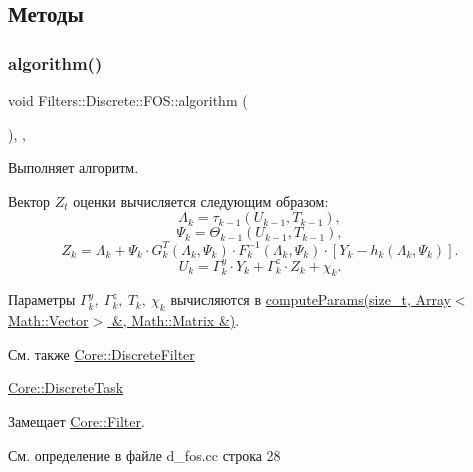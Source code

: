 \subsection{Методы}
\hypertarget{class_filters_1_1_discrete_1_1_f_o_s_a66b52dd04e77257393fe156b71e5582f}{}\label{class_filters_1_1_discrete_1_1_f_o_s_a66b52dd04e77257393fe156b71e5582f} 
\subsubsection{\texorpdfstring{algorithm()}{algorithm()}}
{\footnotesize\ttfamily void Filters\+::\+Discrete\+::\+F\+O\+S\+::algorithm (\begin{DoxyParamCaption}{ }\end{DoxyParamCaption})\hspace{0.3cm}{\ttfamily [override]}, {\ttfamily [protected]}, {\ttfamily [virtual]}}



Выполняет алгоритм. 

Вектор $Z_t$ оценки вычисляется следующим образом\+: \[\Lambda_k = \tau_{k-1}(U_{k-1}, T_{k-1}),\] \[\Psi_k = \Theta_{k-1}(U_{k-1}, T_{k-1}),\] \[Z_k = \Lambda_k + \Psi_k \cdot G_k^T(\Lambda_k, \Psi_k) \cdot F_k^{-1}(\Lambda_k, \Psi_k) \cdot [Y_k - h_k(\Lambda_k, \Psi_k)].\] \[U_k = \Gamma_k^y \cdot Y_k + \Gamma_k^z \cdot Z_k + \chi_k.\]

Параметры $\Gamma_k^y,\ \Gamma_k^z,\ T_k,\ \chi_k$ вычисляются в \hyperlink{class_filters_1_1_discrete_1_1_f_o_s_ac00393ddad3a1ba203e09db8cbc52944}{compute\+Params(size\+\_\+t, Array$<$\+Math\+::\+Vector$>$ \&, Math\+::\+Matrix \&)}.

\begin{DoxySeeAlso}{См. также}
\hyperlink{class_core_1_1_discrete_filter}{Core\+::\+Discrete\+Filter} 

\hyperlink{class_core_1_1_discrete_task}{Core\+::\+Discrete\+Task} 
\end{DoxySeeAlso}


Замещает \hyperlink{class_core_1_1_filter_a438681ee3e54aba2148042d9f8011ab8}{Core\+::\+Filter}.



См. определение в файле d\+\_\+fos.\+cc строка 28

\hypertarget{class_filters_1_1_discrete_1_1_f_o_s_ac00393ddad3a1ba203e09db8cbc52944}{}\label{class_filters_1_1_discrete_1_1_f_o_s_ac00393ddad3a1ba203e09db8cbc52944} 
